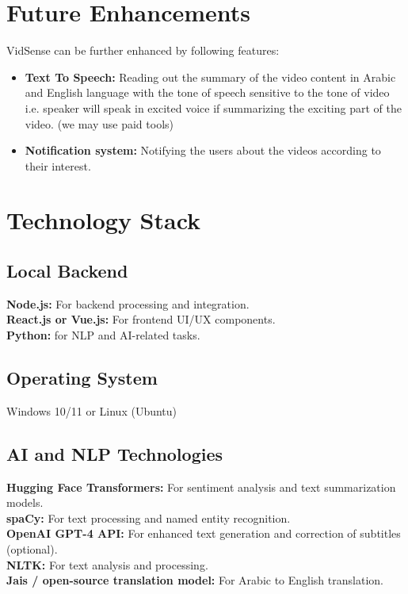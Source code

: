 \documentclass{bscs}
\begin{document}
\chapter{Future Enhancements}

VidSense can be further enhanced by following features:  
\begin{itemize}
    \item \textbf{Text To Speech:} Reading out the summary of the video content in Arabic and English
language with the tone of speech sensitive to the tone of video i.e. speaker will speak in
excited voice if summarizing the exciting part of the video. (we may use paid tools)
    
    \item \textbf{Notification system:} Notifying the users about the videos according to their interest. 
    
\end{itemize}

\chapter{Technology Stack}

\section{Local Backend}
\textbf{Node.js:} For backend processing and integration.\\
\textbf{React.js or Vue.js:} For frontend UI/UX components.\\
\textbf{Python:} for NLP and AI-related tasks.\\[10pt]

\section{Operating System}
Windows 10/11 or Linux (Ubuntu)\\[10pt]

\section{AI and NLP Technologies}
\textbf{Hugging Face Transformers:} For sentiment analysis and text summarization models.\\
\textbf{spaCy:} For text processing and named entity recognition.\\
\textbf{OpenAI GPT-4 API:} For enhanced text generation and correction of subtitles (optional).\\
\textbf{NLTK:} For text analysis and processing.\\
\textbf{Jais / open-source translation model:} For Arabic to English translation.\\
\end{document}
